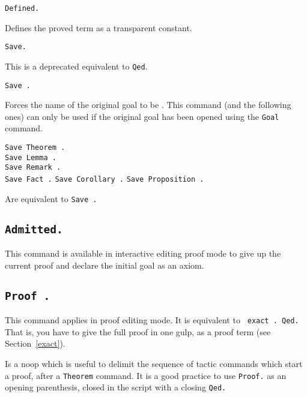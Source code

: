 \begin{Variants}

\item {\tt Defined.}
\label{Defined} 

  Defines the proved term as a transparent constant.

\item {\tt Save.}

  This is a deprecated equivalent to {\tt Qed}.

\item {\tt Save {\ident}.}
  
  Forces the name of the original goal to be {\ident}.  This command
  (and the following ones) can only be used if the original goal has
  been opened using the {\tt Goal} command.

\item {\tt Save Theorem {\ident}.} \\
 {\tt Save Lemma {\ident}.} \\
 {\tt Save Remark {\ident}.}\\
 {\tt Save Fact {\ident}.}
 {\tt Save Corollary {\ident}.}
 {\tt Save Proposition {\ident}.}

  Are equivalent to {\tt Save {\ident}.} 
\end{Variants}

\subsection[\tt Admitted.]{\tt Admitted.\label{Admitted}}
This command is available in interactive editing proof mode to give up
the current proof and declare the initial goal as an axiom.

\subsection[\tt Proof {\term}.]{\tt Proof {\term}.
\label{BeginProof}}
This command applies in proof editing mode. It is equivalent to {\tt
  exact {\term}. Qed.} That is, you have to give the full proof in
one gulp, as a proof term (see Section~\ref{exact}).

  
  Is a noop which is useful to delimit the sequence of tactic commands
  which start a proof, after a {\tt Theorem} command.  It is a good
  practice to use {\tt Proof.} as an opening parenthesis, closed in
  the script with a closing {\tt Qed.}

